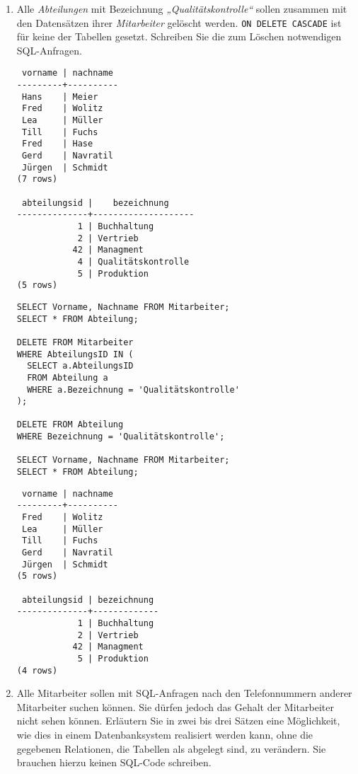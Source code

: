 \documentclass{bschlangaul-aufgabe}
\begin{document}
\begin{enumerate}

\item Alle \emph{Abteilungen} mit Bezeichnung
\emph{„Qualitätskontrolle“} sollen zusammen mit den Datensätzen ihrer
\emph{Mitarbeiter} gelöscht
werden. \verb|ON DELETE CASCADE| ist für keine der Tabellen gesetzt.
Schreiben Sie die zum Löschen notwendigen SQL-Anfragen.

\begin{liAntwort}
\begin{verbatim}
 vorname | nachname
---------+----------
 Hans    | Meier
 Fred    | Wolitz
 Lea     | Müller
 Till    | Fuchs
 Fred    | Hase
 Gerd    | Navratil
 Jürgen  | Schmidt
(7 rows)

 abteilungsid |    bezeichnung
--------------+--------------------
            1 | Buchhaltung
            2 | Vertrieb
           42 | Managment
            4 | Qualitätskontrolle
            5 | Produktion
(5 rows)
\end{verbatim}

\begin{verbatim}
SELECT Vorname, Nachname FROM Mitarbeiter;
SELECT * FROM Abteilung;

DELETE FROM Mitarbeiter
WHERE AbteilungsID IN (
  SELECT a.AbteilungsID
  FROM Abteilung a
  WHERE a.Bezeichnung = 'Qualitätskontrolle'
);

DELETE FROM Abteilung
WHERE Bezeichnung = 'Qualitätskontrolle';

SELECT Vorname, Nachname FROM Mitarbeiter;
SELECT * FROM Abteilung;
\end{verbatim}

\begin{verbatim}
 vorname | nachname
---------+----------
 Fred    | Wolitz
 Lea     | Müller
 Till    | Fuchs
 Gerd    | Navratil
 Jürgen  | Schmidt
(5 rows)

 abteilungsid | bezeichnung
--------------+-------------
            1 | Buchhaltung
            2 | Vertrieb
           42 | Managment
            5 | Produktion
(4 rows)
\end{verbatim}
\end{liAntwort}


\item Alle Mitarbeiter sollen mit SQL-Anfragen nach den Telefonnummern
anderer Mitarbeiter suchen können. Sie dürfen jedoch das Gehalt der
Mitarbeiter nicht sehen können. Erläutern Sie in zwei bis drei Sätzen
eine Möglichkeit, wie dies in einem Datenbanksystem realisiert werden
kann, ohne die gegebenen Relationen, die Tabellen als abgelegt sind, zu
verändern. Sie brauchen hierzu keinen SQL-Code schreiben.


\end{enumerate}
\end{document}
